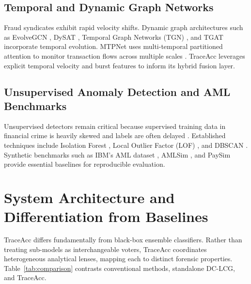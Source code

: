 \documentclass[journal]{IEEEtran}
\begin{document}
\subsection{Temporal and Dynamic Graph Networks}
Fraud syndicates exhibit rapid velocity shifts. Dynamic graph architectures such as EvolveGCN \cite{pareja2020evolvegcn}, DySAT \cite{sankar2020dysat}, Temporal Graph Networks (TGN) \cite{rossi2020temporal}, and TGAT \cite{xu2020inductive} incorporate temporal evolution. MTPNet uses multi-temporal partitioned attention to monitor transaction flows across multiple scales \cite{guang2025mtpnet}. TraceAcc leverages explicit temporal velocity and burst features to inform its hybrid fusion layer.

\subsection{Unsupervised Anomaly Detection and AML Benchmarks}
Unsupervised detectors remain critical because supervised training data in financial crime is heavily skewed and labels are often delayed \cite{hilal2022financial, pang2021deep}. Established techniques include Isolation Forest \cite{liu2008isolation}, Local Outlier Factor (LOF) \cite{breunig2000lof}, and DBSCAN \cite{ester1996density}. Synthetic benchmarks such as IBM's AML dataset \cite{altman2023realistic}, AMLSim \cite{suzumura2021amlsim}, and PaySim \cite{lopez2016paysim} provide essential baselines for reproducible evaluation.

\section{System Architecture and Differentiation from Baselines}
\label{sec:differentiation}

TraceAcc differs fundamentally from black-box ensemble classifiers. Rather than treating sub-models as interchangeable voters, TraceAcc coordinates heterogeneous analytical lenses, mapping each to distinct forensic properties. Table~\ref{tab:comparison} contrasts conventional methods, standalone DC-LCG, and TraceAcc.
\end{document}
